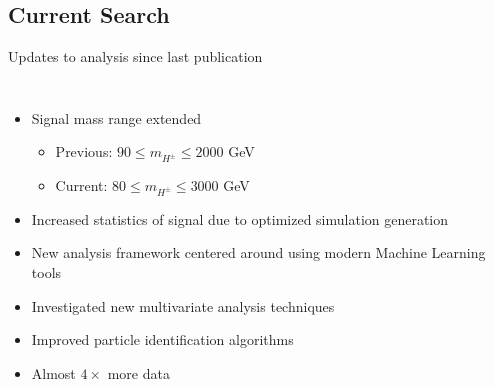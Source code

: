 \documentclass[aspectratio=169,xcolor=table]{beamer}
\begin{document}
  \subsection{Current Search}

    \begin{frame}[t]{Updates to analysis since last publication}
      \begin{columns}
        \begin{itemize}
          \item Signal mass range extended 
          \begin{itemize}
            \item Previous: $90 \leq m_{H^{\pm}} \leq 2000$ GeV
            \item Current:  $80 \leq m_{H^{\pm}} \leq 3000$ GeV
          \end{itemize}
          \item Increased statistics of signal due to optimized simulation generation
          \item New analysis framework centered around using modern Machine Learning tools
          \item Investigated new multivariate analysis techniques
          \item Improved particle identification algorithms
          \item Almost $4\times$ more data
        \end{itemize}


\end{columns}
\end{frame}
\end{document}

